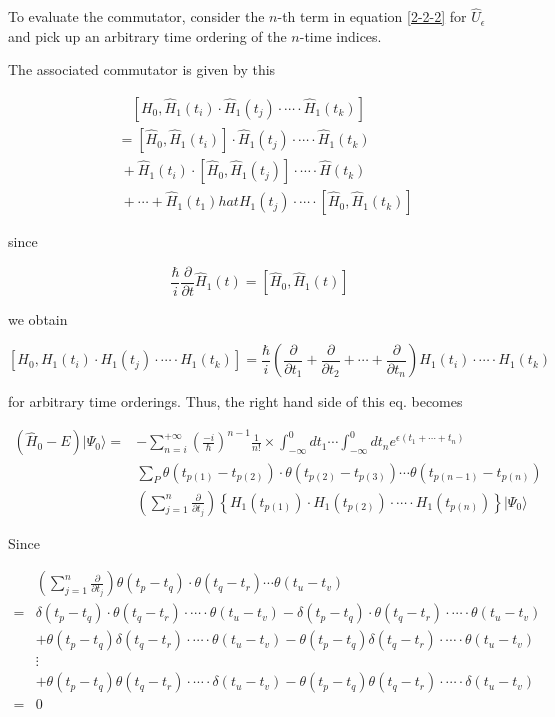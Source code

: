 ﻿\documentclass[twoside]{book}
\numberwithin{equation}{section}
\begin{document}
To evaluate the commutator, consider the $n$-th term in equation \eqref{2-2-2} for $\hat{U}_\epsilon$ and pick up an arbitrary time ordering of the $n$-time indices. 

The associated commutator is given by this

\[\begin{split}
&\quad[H_0,\hat{H}_1(t_i)\cdot\hat{H}_1(t_j)\cdot\cdots\cdot\hat{H}_1(t_k)]\\
&=[\hat{H}_0,\hat{H}_1(t_i)]\cdot\hat{H}_1(t_j)\cdot\cdots\cdot\hat{H}_1(t_k)\\
&\ +\hat{H}_1(t_i)\cdot[\hat{H}_0,\hat{H}_1(t_j)]\cdot\cdots\cdot\hat{H}(t_k)\\
&\ +\cdots+\hat{H}_1(t_1)hat{H}_1(t_j)\cdot\cdots\cdot[\hat{H}_0,\hat{H}_1(t_k)]
\end{split}\]

since

\[\frac{\hbar}{i}\frac{\partial}{\partial t}\hat{H}_1(t)=[\hat{H}_0,\hat{H}_1(t)] \]

we obtain

\[[H_0,H_1(t_i)\cdot H_1(t_j) \cdot\cdots\cdot H_1(t_k)]=\frac{\hbar}{i}\left(\frac{\partial}{\partial t_1}+\frac{\partial}{\partial t_2}+\cdots+\frac{\partial}{\partial t_n}\right)H_1(t_i)\cdot\cdots\cdot H_1(t_k) \]

for arbitrary time orderings. Thus, the right hand side of this eq. becomes

\[\begin{split}
(\hat{H}_0-E)|\Psi_0\rangle =& -\sum_{n=i}^{+\infty}\left(\frac{-i}{\hbar}\right)^{n-1}\frac{1}{n!}\times\int_{-\infty}^0 dt_1\cdots\int_{-\infty}^0 dt_n e^{\epsilon(t_1+\cdots+t_n)}\\
&\sum_P\theta(t_{p(1)}-t_{p(2)})\cdot\theta(t_{p(2)}-t_{p(3)})\cdots\theta(t_{p(n-1)}-t_{p(n)})\\
&\left(\sum_{j=1}^n\frac{\partial}{\partial t_j}\right) \left\{H_1(t_{p(1)})\cdot H_1(t_{p(2)})\cdot\cdots\cdot H_1(t_{p(n)})\right\} |\Psi_0\rangle
\end{split}\]

Since

\[\begin{split}
&\left(\sum_{j=1}^n\frac{\partial}{\partial t_j}\right)\theta(t_p-t_q)\cdot\theta(t_q-t_r)\cdots\theta(t_u-t_v)\\
=&\delta(t_p-t_q)\cdot\theta(t_q-t_r)\cdot\cdots\cdot\theta(t_u-t_v)-\delta(t_p-t_q)\cdot\theta(t_q-t_r)\cdot\cdots\cdot\theta(t_u-t_v)\\
&+\theta(t_p-t_q)\delta(t_q-t_r)\cdot\cdots\cdot\theta(t_u-t_v)-\theta(t_p-t_q)\delta(t_q-t_r)\cdot\cdots\cdot\theta(t_u-t_v)\\
&\vdots\\
&+\theta(t_p-t_q)\theta(t_q-t_r)\cdot\cdots\cdot\delta(t_u-t_v)-\theta(t_p-t_q)\theta(t_q-t_r)\cdot\cdots\cdot\delta(t_u-t_v)\\
=&0
\end{split}\]
\end{document}
